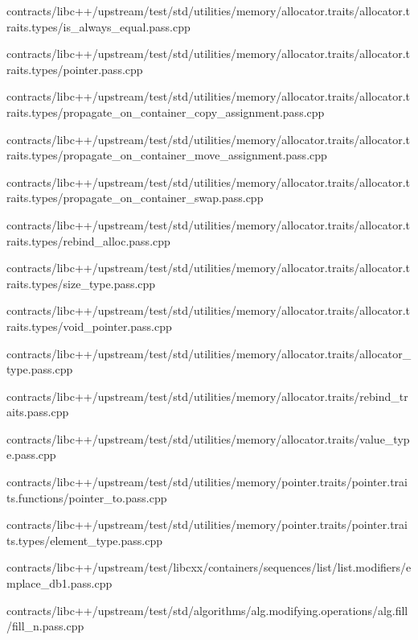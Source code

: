 \begin{DoxyCompactItemize}
contracts/libc++/upstream/test/std/utilities/memory/allocator.\+traits/allocator.\+traits.\+types/is\+\_\+always\+\_\+equal.\+pass.\+cpp\item 
contracts/libc++/upstream/test/std/utilities/memory/allocator.\+traits/allocator.\+traits.\+types/pointer.\+pass.\+cpp\item 
contracts/libc++/upstream/test/std/utilities/memory/allocator.\+traits/allocator.\+traits.\+types/propagate\+\_\+on\+\_\+container\+\_\+copy\+\_\+assignment.\+pass.\+cpp\item 
contracts/libc++/upstream/test/std/utilities/memory/allocator.\+traits/allocator.\+traits.\+types/propagate\+\_\+on\+\_\+container\+\_\+move\+\_\+assignment.\+pass.\+cpp\item 
contracts/libc++/upstream/test/std/utilities/memory/allocator.\+traits/allocator.\+traits.\+types/propagate\+\_\+on\+\_\+container\+\_\+swap.\+pass.\+cpp\item 
contracts/libc++/upstream/test/std/utilities/memory/allocator.\+traits/allocator.\+traits.\+types/rebind\+\_\+alloc.\+pass.\+cpp\item 
contracts/libc++/upstream/test/std/utilities/memory/allocator.\+traits/allocator.\+traits.\+types/size\+\_\+type.\+pass.\+cpp\item 
contracts/libc++/upstream/test/std/utilities/memory/allocator.\+traits/allocator.\+traits.\+types/void\+\_\+pointer.\+pass.\+cpp\item 
contracts/libc++/upstream/test/std/utilities/memory/allocator.\+traits/allocator\+\_\+type.\+pass.\+cpp\item 
contracts/libc++/upstream/test/std/utilities/memory/allocator.\+traits/rebind\+\_\+traits.\+pass.\+cpp\item 
contracts/libc++/upstream/test/std/utilities/memory/allocator.\+traits/value\+\_\+type.\+pass.\+cpp\item 
contracts/libc++/upstream/test/std/utilities/memory/pointer.\+traits/pointer.\+traits.\+functions/pointer\+\_\+to.\+pass.\+cpp\item 
contracts/libc++/upstream/test/std/utilities/memory/pointer.\+traits/pointer.\+traits.\+types/element\+\_\+type.\+pass.\+cpp\item 
contracts/libc++/upstream/test/libcxx/containers/sequences/list/list.\+modifiers/emplace\+\_\+db1.\+pass.\+cpp\item 
contracts/libc++/upstream/test/std/algorithms/alg.\+modifying.\+operations/alg.\+fill/fill\+\_\+n.\+pass.\+cpp\item 

\end{DoxyCompactItemize}
